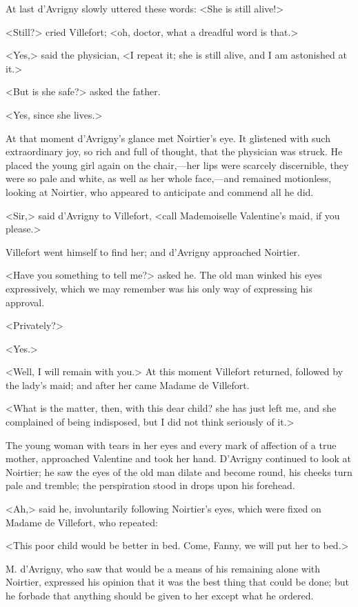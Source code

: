  At last d'Avrigny slowly uttered these words: <She is still alive!> 

 <Still?> cried Villefort; <oh, doctor, what a dreadful word is that.> 

 <Yes,> said the physician, <I repeat it; she is still alive, and I am astonished at it.> 

 <But is she safe?> asked the father. 

 <Yes, since she lives.> 

 At that moment d'Avrigny's glance met Noirtier's eye. It glistened with such extraordinary joy, so rich and full of thought, that the physician was struck. He placed the young girl again on the chair,—her lips were scarcely discernible, they were so pale and white, as well as her whole face,—and remained motionless, looking at Noirtier, who appeared to anticipate and commend all he did. 

 <Sir,> said d'Avrigny to Villefort, <call Mademoiselle Valentine's maid, if you please.> 

 Villefort went himself to find her; and d'Avrigny approached Noirtier. 

 <Have you something to tell me?> asked he. The old man winked his eyes expressively, which we may remember was his only way of expressing his approval. 

 <Privately?> 

 <Yes.> 

 <Well, I will remain with you.> At this moment Villefort returned, followed by the lady's maid; and after her came Madame de Villefort. 

 <What is the matter, then, with this dear child? she has just left me, and she complained of being indisposed, but I did not think seriously of it.> 

 The young woman with tears in her eyes and every mark of affection of a true mother, approached Valentine and took her hand. D'Avrigny continued to look at Noirtier; he saw the eyes of the old man dilate and become round, his cheeks turn pale and tremble; the perspiration stood in drops upon his forehead. 

 <Ah,> said he, involuntarily following Noirtier's eyes, which were fixed on Madame de Villefort, who repeated: 

 <This poor child would be better in bed. Come, Fanny, we will put her to bed.> 

 M. d'Avrigny, who saw that would be a means of his remaining alone with Noirtier, expressed his opinion that it was the best thing that could be done; but he forbade that anything should be given to her except what he ordered. 

